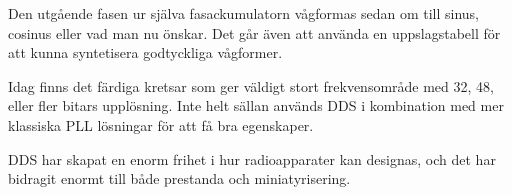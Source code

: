 Den utgående fasen ur själva fasackumulatorn vågformas sedan om till sinus,
cosinus eller vad man nu önskar. Det går även att använda en uppslagstabell
för att kunna syntetisera godtyckliga vågformer.

Idag finns det färdiga kretsar som ger väldigt stort frekvensområde med 32, 48,
eller fler bitars upplösning.
Inte helt sällan används DDS i kombination med mer klassiska PLL lösningar
för att få bra egenskaper.

DDS har skapat en enorm frihet i hur radioapparater kan designas, och det har
bidragit enormt till både prestanda och miniatyrisering.

